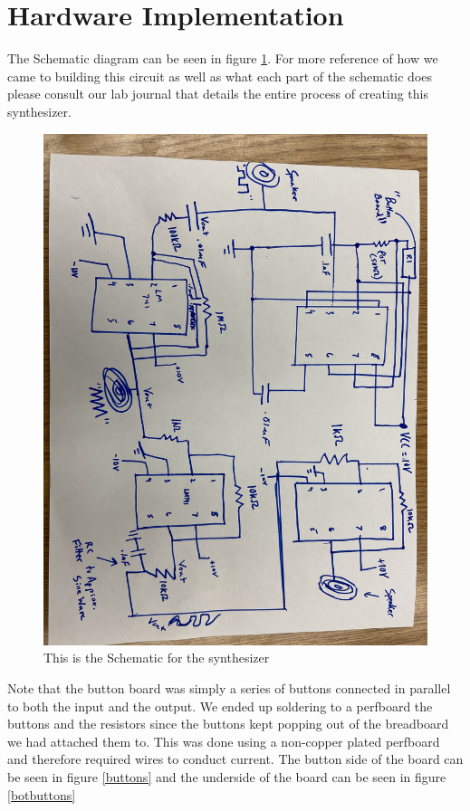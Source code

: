 \documentclass[12pt]{article}
\begin{document}
\section{Hardware Implementation}
The Schematic diagram can be seen in figure \ref{schematic}. For more reference of how we came to building this circuit as well as what each part of the schematic does please consult our lab journal that details the entire process of creating this synthesizer.
\begin{figure}[h!]
    \centering
    \includegraphics[scale=0.1]{schematic.jpg}
    \caption{This is the Schematic for the synthesizer}
    \label{schematic}
\end{figure}
\newpage
Note that the button board was simply a series of buttons connected in parallel to both the input and the output. 
We ended up soldering to a perfboard the buttons and the resistors since the buttons kept popping out of the breadboard we had attached them to. This was done using a non-copper plated perfboard and therefore required wires to conduct current. The button side of the board can be seen in figure \ref{buttons} and the underside of the board can be seen in figure \ref{botbuttons}
\end{document}

